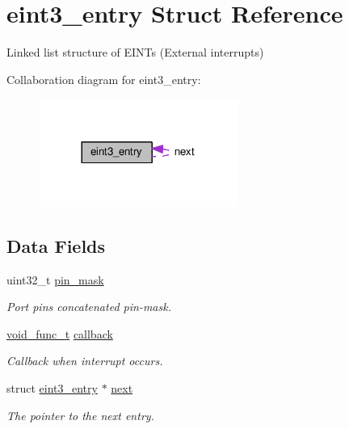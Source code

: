 \hypertarget{structeint3__entry}{}\section{eint3\+\_\+entry Struct Reference}
\label{structeint3__entry}


Linked list structure of E\+I\+N\+Ts (External interrupts)  




Collaboration diagram for eint3\+\_\+entry\+:\nopagebreak
\begin{figure}[H]
\begin{center}
\leavevmode
\includegraphics[width=185pt]{d8/df6/structeint3__entry__coll__graph}
\end{center}
\end{figure}
\subsection*{Data Fields}
\begin{DoxyCompactItemize}
\item 
uint32\+\_\+t \hyperlink{structeint3__entry_abd6bc384996eb947fc0e9b6ae5002b47}{pin\+\_\+mask}
\begin{DoxyCompactList}\small\item\em Port pin\textquotesingle{}s concatenated pin-\/mask. \end{DoxyCompactList}\item 
\hyperlink{lpc__sys_8h_a2425c2b3462f867da9fd2ab76d9d47b1}{void\+\_\+func\+\_\+t} \hyperlink{structeint3__entry_a3b97b9cf5d0ed8e39024e4f5af34f866}{callback}
\begin{DoxyCompactList}\small\item\em Callback when interrupt occurs. \end{DoxyCompactList}\item 
struct \hyperlink{structeint3__entry}{eint3\+\_\+entry} $\ast$ \hyperlink{structeint3__entry_ae7d52ddae024fa3ff613d5fc7967b43c}{next}
\begin{DoxyCompactList}\small\item\em The pointer to the next entry. \end{DoxyCompactList}\end{DoxyCompactItemize}


